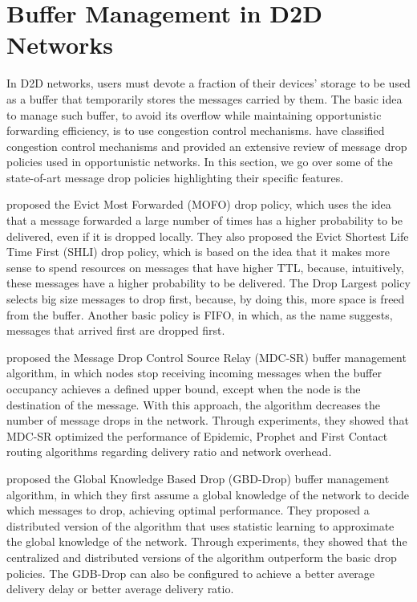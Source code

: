 \section{Buffer Management in D2D Networks}

In D2D networks, users must devote a fraction of their devices’ storage to be used as a buffer that temporarily stores the messages carried by them.
The basic idea to manage such buffer, to avoid its overflow while maintaining opportunistic forwarding efficiency, is to use congestion control mechanisms. \citet{silva2015survey} have classified congestion control mechanisms and provided an extensive review of message drop policies used in opportunistic networks. In this section, we go over some of the state-of-art message drop policies highlighting their specific features.

\citet{lindgren2006evaluation} proposed the Evict Most Forwarded (MOFO) drop policy, which uses the idea that a message forwarded a large number
of times has a higher probability to be delivered, even if it is dropped locally. They also proposed the Evict Shortest Life Time First (SHLI) drop policy, which is based on the idea that it makes more sense to spend resources on messages that have higher TTL, because, intuitively, these messages have a higher probability to be delivered. The Drop Largest policy \citep{rashid2010efficient} selects big size messages to drop first, because, by doing this, more space is freed from the buffer. Another basic policy is FIFO, in which, as the name suggests, messages that arrived first are dropped first.

\citet{rashid2013message} proposed the Message Drop Control Source Relay (MDC-SR) buffer management algorithm, in which nodes stop receiving incoming messages when the buffer occupancy achieves a defined upper bound, except when the node is the destination of the message. With this approach, the algorithm decreases the number of message drops in the network. Through experiments, they showed that MDC-SR optimized the performance of Epidemic, Prophet and First Contact routing algorithms regarding delivery ratio and
network overhead.

\citet{krifa2008optimal} proposed the Global Knowledge Based Drop (GBD-Drop) buffer management algorithm, in which they first assume a global knowledge of the network to decide which messages to drop, achieving optimal performance. They proposed a distributed version of the algorithm that uses statistic learning to approximate the global knowledge
of the network. Through experiments, they showed that the centralized and distributed versions of the algorithm outperform the basic drop policies. The GDB-Drop can also be configured to achieve a better average delivery delay or better average delivery ratio.

